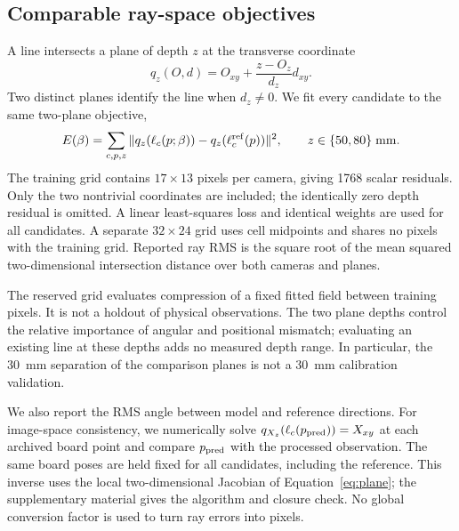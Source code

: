 \documentclass[10pt,a4paper]{article}
\begin{document}
\subsection{Comparable ray-space objectives}\label{sec:comparison}
A line intersects a plane of depth $z$ at the transverse coordinate
\begin{equation}
q_z(O,d)=O_{xy}+\frac{z-O_z}{d_z}d_{xy}.
\label{eq:plane}
\end{equation}
Two distinct planes identify the line when $d_z\ne0$. We fit every candidate to the same two-plane objective,
\begin{equation}
E(\beta)=\sum_{c,p,z}\|q_z(\ell_c(p;\beta))-q_z(\ell_c^{\rm ref}(p))\|^2,
\qquad z\in\{50,80\}\;\mathrm{mm}.
\label{eq:objective}
\end{equation}
The training grid contains $17\times13$ pixels per camera, giving 1768 scalar residuals. Only the two nontrivial coordinates are included; the identically zero depth residual is omitted. A linear least-squares loss and identical weights are used for all candidates. A separate $32\times24$ grid uses cell midpoints and shares no pixels with the training grid. Reported ray RMS is the square root of the mean squared two-dimensional intersection distance over both cameras and planes.

The reserved grid evaluates compression of a fixed fitted field between training pixels. It is not a holdout of physical observations. The two plane depths control the relative importance of angular and positional mismatch; evaluating an existing line at these depths adds no measured depth range. In particular, the 30~mm separation of the comparison planes is not a 30~mm calibration validation.

We also report the RMS angle between model and reference directions. For image-space consistency, we numerically solve $q_{X_z}(\ell_c(p_{\rm pred}))=X_{xy}$ at each archived board point and compare $p_{\rm pred}$ with the processed observation. The same board poses are held fixed for all candidates, including the reference. This inverse uses the local two-dimensional Jacobian of Equation~\ref{eq:plane}; the supplementary material gives the algorithm and closure check. No global conversion factor is used to turn ray errors into pixels.
\end{document}
